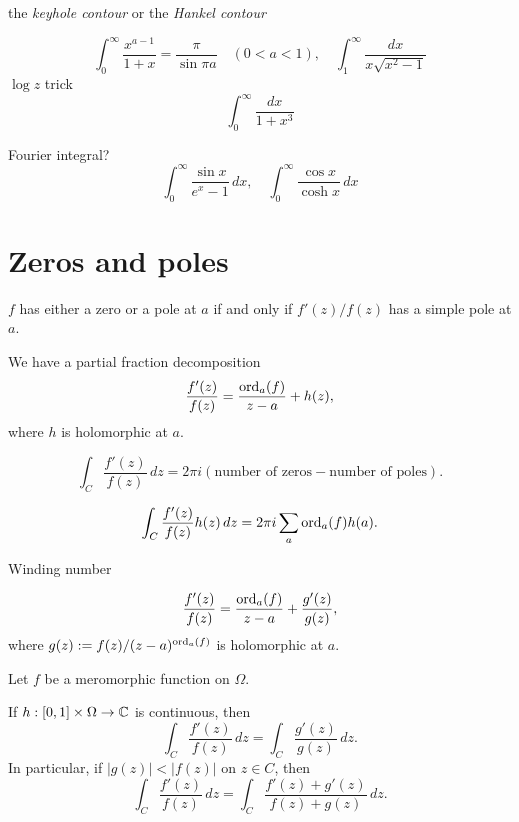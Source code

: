 \documentclass{../../large}
\begin{document}
\begin{prb}
the \emph{keyhole contour} or the \emph{Hankel contour}

\[\int_0^\infty\frac{x^{a-1}}{1+x}=\frac\pi{\sin\pi a}\quad(0<a<1),\quad\int_1^\infty\frac{dx}{x\sqrt{x^2-1}}\]
$\log z$ trick
\[\int_0^\infty\frac{dx}{1+x^3}\]
\end{prb}

\begin{prb}
Fourier integral?
\[\int_0^\infty\frac{\sin x}{e^x-1}\,dx,\quad\int_0^\infty\frac{\cos x}{\cosh x}\,dx\]
\end{prb}







\section{Zeros and poles}
\begin{prb}
\begin{parts}
\item $f$ has either a zero or a pole at $a$ if and only if $f'(z)/f(z)$ has a simple pole at $a$. 
\item We have a partial fraction decomposition
\[\frac{f'(z)}{f(z)}=\frac{\operatorname{ord}_a(f)}{z-a}+h(z),\]
where $h$ is holomorphic at $a$.
\item
\[\int_C\frac{f'(z)}{f(z)}\,dz=2\pi i(\text{number of zeros}-\text{number of poles}).\]
\item
\[\int_C\frac{f'(z)}{f(z)}h(z)\,dz=2\pi i\sum_a\operatorname{ord}_a(f)h(a).\]
\item Winding number
\end{parts}
\end{prb}
\begin{pf}
\[\frac{f'(z)}{f(z)}=\frac{\operatorname{ord}_a(f)}{z-a}+\frac{g'(z)}{g(z)},\]
where $g(z):=f(z)/(z-a)^{\operatorname{ord}_a(f)}$ is holomorphic at $a$.
\end{pf}


\begin{prb}
Let $f$ be a meromorphic function on $\Omega$.
\begin{parts}
\item
If $h:[0,1]\times\Omega\to\mathbb{C}$ is continuous, then 
\[\int_C\frac{f'(z)}{f(z)}\,dz=\int_C\frac{g'(z)}{g(z)}\,dz.\]
In particular, if $|g(z)|<|f(z)|$ on $z\in C$, then
\[\int_C\frac{f'(z)}{f(z)}\,dz=\int_C\frac{f'(z)+g'(z)}{f(z)+g(z)}\,dz.\]
\end{parts}
\end{prb}
\end{document}
